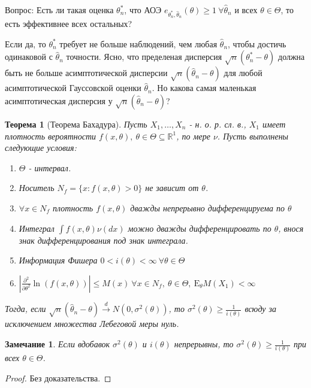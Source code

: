 \documentclass[12pt]{article}
\newtheorem{remark}{Замечание}
\theoremstyle{basic_theorem}
\theoremstyle{name_theorem}
\newtheorem*{named_theorem}{Теорема}
\def\R{ \mathbb{R} }
\def\E{ \mathrm{E} }
\begin{document}
    Вопрос: Есть ли такая оценка \(\theta^*_n\), что АОЭ \(e_{\theta^*_n, \widehat{\theta}_n}(\theta) \geq 1 \ \forall \widehat{\theta}_n\)
    и всех \(\theta \in \Theta\), то есть эффективнее всех остальных?

    Если да, то \(\theta^*_n\) требует не больше наблюдений, чем любая \(\widehat{\theta}_n\), чтобы достичь одинаковой с \(\widehat{\theta}_n\) точности.
    Ясно, что пределеная дисперсия \(\sqrt{n}(\theta^*_n - \theta)\) должна быть не больше асимптотической дисперсии
    \(\sqrt{n}(\widehat{\theta}_n - \theta)\) для любой асимптотической Гауссовской оценки \(\widehat{\theta}_n\). Но
    какова самая маленькая асимптотическая дисперсия у \(\sqrt{n}(\widehat{\theta}_n - \theta)\)?

    \begin{named_theorem}[Теорема Бахадура]
        \label{th::bahadur}
        Пусть \(X_1, \ldots, X_n\) - н. о. р. сл. в., \(X_1\) имеет
        плотность вероятности \(f(x, \theta),\ \theta \in \Theta \subseteq \R^1\),
        по мере \(\nu\). Пусть выполнены следующие условия:
        \begin{enumerate}
            \item \(\Theta\) - интервал.
            \item Носитель \(N_f = \{x: f(x, \theta) > 0\}\) не зависит от \(\theta\).
            \item \label{th::bahadur:density} \(\forall x \in N_f\) плотность \(f(x, \theta)\) дважды непрерывно
                дифференцируема по \(\theta\)
            \item \label{th::bahadur:integral} Интеграл \(\int f(x, \theta)\nu(dx)\)  можно
                дважды дифференцировать по \(\theta\), внося знак
                дифференцирования под знак интеграла.
            \item Информация Фишера \(0 < i(\theta) < \infty \ \forall \theta \in \Theta\)
            \item \label{th::bahadur:second_partial} \(\left\lvert \frac{\partial^2}{\partial \theta^2} \ln(f(x, \theta)) \right\rvert  \leq M(x) \ \forall x \in N_f, \ \theta \in \Theta, \ \E_\theta M(X_1) < \infty\)
        \end{enumerate}
        Тогда, если \(\sqrt{n}(\widehat{\theta}_n - \theta) \xrightarrow{d} N(0, \sigma^2(\theta))\),
        то \(\sigma^2(\theta) \geq \frac{1}{i(\theta)}\) всюду за исключением
        множества Лебеговой меры нуль.
    \end{named_theorem}
    \begin{remark}
        Если вдобавок \(\sigma^2(\theta)\) и \(i(\theta)\) непрерывны,
        то \(\sigma^2(\theta) \geq \frac{1}{i(\theta)}\) при всех \(\theta \in \Theta\).
    \end{remark}
    \begin{proof}
        Без доказательства.
    \end{proof}
\end{document}
